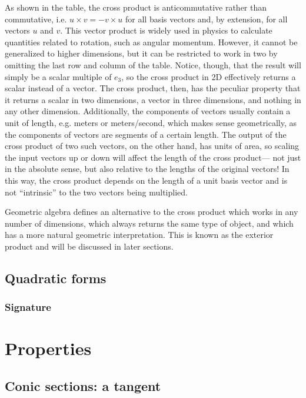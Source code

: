 \documentclass{article}
\begin{document}
As shown in the table,
the cross product is anticommutative rather than commutative,
i.e. $u \times v = -v \times u$ for all basis vectors
and, by extension, for all vectors $u$ and $v$.
This vector product is widely used in physics
to calculate quantities related to rotation, such as angular momentum.
However, it cannot be generalized to higher dimensions,
but it can be restricted to work in two
by omitting the last row and column of the table.
Notice, though, that the result will simply be a scalar multiple of $e_3$,
so the cross product in 2D effectively returns a scalar instead of a vector.
The cross product, then, has the peculiar property
that it returns a scalar in two dimensions,
a vector in three dimensions,
and nothing in any other dimension.
Additionally, the components of vectors usually contain a unit of length,
e.g. meters or meters/second,
which makes sense geometrically, as the components of vectors are segments of a certain length.
The output of the cross product of two such vectors, on the other hand, has units of area,
so scaling the input vectors up or down will affect the length of the cross product---
not just in the absolute sense, but also relative to the lengths of the original vectors!
In this way, the cross product depends on the length of a unit basis vector
and is not ``intrinsic'' to the two vectors being multiplied.

Geometric algebra defines an alternative to the cross product
which works in any number of dimensions,
which always returns the same type of object,
and which has a more natural geometric interpretation.
This is known as the exterior product and will be discussed in later sections.

\subsection{Quadratic forms}

\subsubsection{Signature}

\section{Properties}

\subsection{Conic sections: a tangent}
\end{document}
